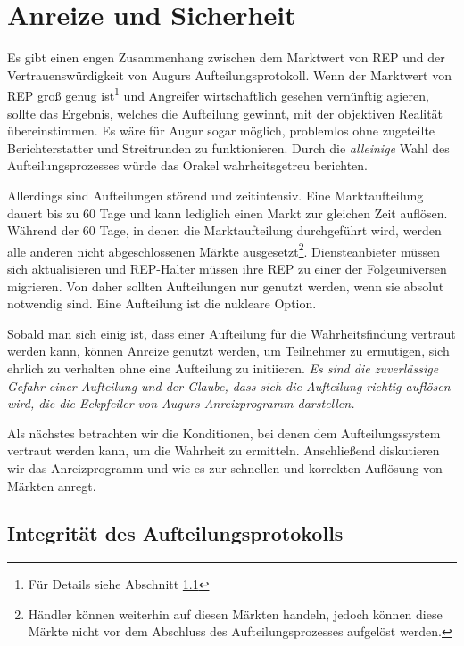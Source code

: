 \documentclass[floatfix,reprint,nofootinbib,amsmath,amssymb,epsfig,pre,floats,letterpaper,groupedaffiliation]{revtex4-1}
\theoremstyle{definition}
\theoremstyle{definition}
\theoremstyle{definition}
\begin{document}
\section{Anreize und Sicherheit}\label{section:incentives_and_security}

Es gibt einen engen Zusammenhang zwischen dem Marktwert von REP und der Vertrauenswürdigkeit von Augurs Aufteilungsprotokoll. Wenn der Marktwert von REP groß genug ist\footnote{Für Details siehe Abschnitt \ref{section:integrity_forking_protocol}} und Angreifer wirtschaftlich gesehen vernünftig agieren, sollte das Ergebnis, welches die Aufteilung gewinnt, mit der objektiven Realität übereinstimmen. Es wäre für Augur sogar möglich, problemlos ohne zugeteilte Berichterstatter und Streitrunden zu funktionieren. Durch die \textit{alleinige} Wahl des Aufteilungsprozesses würde das Orakel wahrheitsgetreu berichten.

Allerdings sind Aufteilungen störend und zeitintensiv. Eine Marktaufteilung dauert bis zu 60 Tage und kann lediglich einen Markt zur gleichen Zeit auflösen. Während der 60 Tage, in denen die Marktaufteilung durchgeführt wird, werden alle anderen nicht abgeschlossenen Märkte ausgesetzt\footnote{Händler können weiterhin auf diesen Märkten handeln, jedoch können diese Märkte nicht vor dem Abschluss des Aufteilungsprozesses aufgelöst werden.}. Diensteanbieter müssen sich aktualisieren und REP-Halter müssen ihre REP zu einer der Folgeuniversen migrieren. Von daher sollten Aufteilungen nur genutzt werden, wenn sie absolut notwendig sind. Eine Aufteilung ist die nukleare Option.

Sobald man sich einig ist, dass einer Aufteilung für die Wahrheitsfindung vertraut werden kann, können Anreize genutzt werden, um Teilnehmer zu ermutigen, sich ehrlich zu verhalten ohne eine Aufteilung zu initiieren. \textit{Es sind die zuverlässige Gefahr einer Aufteilung und der Glaube, dass sich die Aufteilung richtig auflösen wird, die die Eckpfeiler von Augurs Anreizprogramm darstellen.}

Als nächstes betrachten wir die Konditionen, bei denen dem Aufteilungssystem vertraut werden kann, um die Wahrheit zu ermitteln. Anschließend  diskutieren wir das Anreizprogramm und wie es zur schnellen und korrekten Auflösung von Märkten anregt.

\subsection{Integrität des Aufteilungsprotokolls}\label{section:integrity_forking_protocol}
\end{document}
